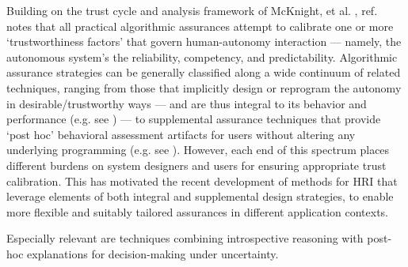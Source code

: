Building on the trust cycle and analysis framework of McKnight, et al. \nisar{[cite]}, ref. \cite{Israelsen2018-qz} notes that all practical algorithmic assurances attempt to calibrate one or more `trustworthiness factors' that govern human-autonomy interaction --- namely, the autonomous system's the reliability, competency, and predictability. Algorithmic assurance strategies can be generally classified along a wide continuum of related techniques, ranging from those that implicitly design or reprogram the autonomy in desirable/trustworthy ways --- and are thus integral to its behavior and performance (e.g. see ) --- to supplemental assurance techniques that provide `post hoc' behavioral assessment artifacts for users without altering any underlying programming (e.g. see ). However, each end of this spectrum places different burdens on system designers and users for ensuring appropriate trust calibration. This has motivated the recent development of methods for HRI that leverage elements of both integral and supplemental design strategies, to enable more flexible and suitably tailored assurances in different application contexts. 

Especially relevant are techniques combining introspective reasoning with post-hoc explanations for decision-making under uncertainty. 

